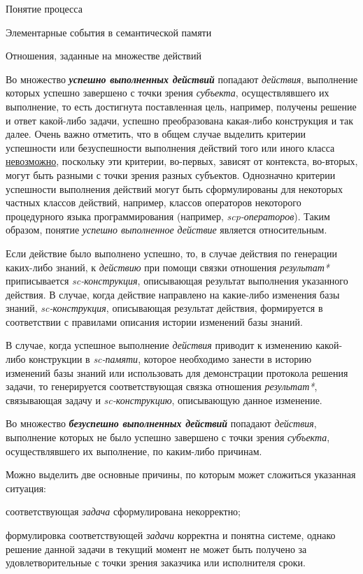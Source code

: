 \begin{frame}{\large Понятие процесса}
\begin{frame}{\large Элементарные события в семантической памяти}
\begin{frame}{Отношения, заданные на множестве действий}
\begin{frame}{}
Во множество \textbf{\textit{успешно выполненных действий}} попадают \textit{действия}, выполнение которых успешно завершено с точки зрения \textit{субъекта}, осуществлявшего их выполнение, то есть достигнута поставленная цель, например, получены решение и ответ какой-либо задачи, успешно преобразована какая-либо конструкция и так далее. Очень важно отметить, что в общем случае выделить критерии успешности или безуспешности выполнения действий того или иного класса \uline{невозможно}, поскольку эти критерии, во-первых, зависят от контекста, во-вторых, могут быть разными с точки зрения разных субъектов. Однозначно критерии успешности выполнения действий могут быть сформулированы для некоторых частных классов действий, например, классов операторов некоторого процедурного языка программирования (например, \textit{scp-операторов}). Таким образом, понятие \textit{успешно выполненное действие} является относительным.
\end{frame}

\begin{frame}{}
Если действие было выполнено успешно, то, в случае действия по генерации каких-либо знаний, к \textit{действию} при помощи связки отношения \textit{результат*} приписывается \textit{sc-конструкция}, описывающая результат выполнения указанного действия. В случае, когда действие направлено на какие-либо изменения базы знаний, \textit{sc-конструкция}, описывающая результат действия, формируется в соответствии с правилами описания истории изменений базы знаний.

В случае, когда успешное выполнение \textit{действия} приводит к изменению какой-либо конструкции в \textit{sc-памяти}, которое необходимо занести в историю изменений базы знаний или использовать для демонстрации протокола решения задачи, то генерируется соответствующая связка отношения \textit{результат*}, связывающая задачу и \textit{sc-конструкцию}, описывающую данное изменение.
\end{frame}

\begin{frame}{}
Во множество \textbf{\textit{безуспешно выполненных действий}} попадают \textit{действия}, выполнение которых не было успешно завершено с точки зрения \textit{субъекта}, осуществлявшего их выполнение, по каким-либо причинам.

Можно выделить две основные причины, по которым может сложиться указанная ситуация:
\begin{textitemize}
	\item соответствующая \textit{задача} сформулирована некорректно;
	\item формулировка соответствующей \textit{задачи} корректна и понятна системе, однако решение данной задачи в текущий момент не может быть получено за удовлетворительные с точки зрения заказчика или исполнителя сроки.
\end{textitemize}
\end{frame}


\end{frame}
\end{frame}
\end{frame}
